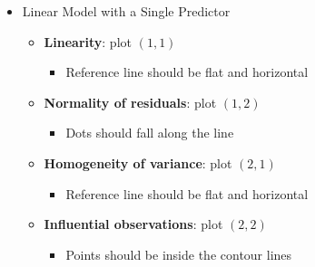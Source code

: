 \documentclass[
  ignorenonframetext,
]{beamer}
\providecommand{\tightlist}{%
  \setlength{\itemsep}{0pt}\setlength{\parskip}{0pt}}\usepackage{longtable,booktabs,array}
\begin{document}
\begin{frame}{}
\label{section-17}
\begin{itemize}
\item
  Linear Model with a Single Predictor

  \begin{itemize}
  \item
    \textbf{Linearity}: plot \((1,1)\)

    \begin{itemize}
    \tightlist
    \item
      Reference line should be flat and horizontal
    \end{itemize}
  \item
    \textbf{Normality of residuals}: plot \((1,2)\)

    \begin{itemize}
    \tightlist
    \item
      Dots should fall along the line
    \end{itemize}
  \item
    \textbf{Homogeneity of variance}: plot \((2,1)\)

    \begin{itemize}
    \tightlist
    \item
      Reference line should be flat and horizontal
    \end{itemize}
  \item
    \textbf{Influential observations}: plot \((2,2)\)

    \begin{itemize}
    \tightlist
    \item
      Points should be inside the contour lines
    \end{itemize}
  \end{itemize}
\end{itemize}
\end{frame}
\end{document}

